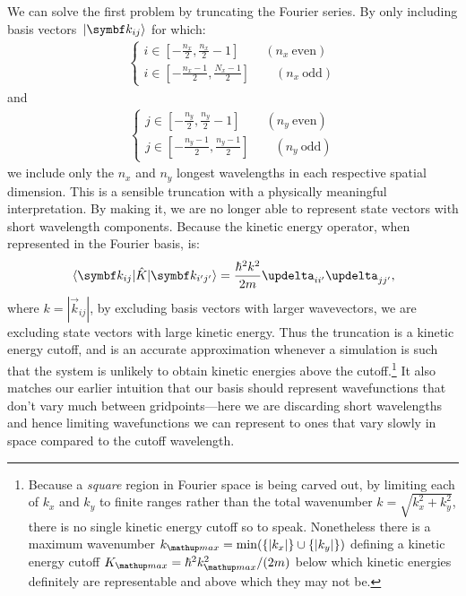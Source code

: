 We can solve the first problem by truncating the Fourier series. By only including basis vectors $\ket{\vec k_{ij}}$ for which:
\begin{align}
\begin{cases}
i \in [-\tfrac{n_x}2, \tfrac{n_x}2 - 1] \qquad (n_x\ \textrm{even})\\
i \in [-\tfrac{n_x - 1}2, \tfrac{N_x - 1}2] \qquad (n_x\ \textrm{odd})
\end{cases}
\end{align}
and
\begin{align}
\begin{cases}
j \in [-\tfrac{n_y}2, \tfrac{n_y}2 - 1] \qquad (n_y\ \textrm{even})\\
j \in [-\tfrac{n_y - 1}2, \tfrac{n_y - 1}2] \qquad (n_y\ \textrm{odd})
\end{cases}
\end{align}
we include only the $n_x$ and $n_y$ longest wavelengths in each respective spatial dimension. This is a sensible truncation with a physically meaningful interpretation. By making it, we are no longer able to represent state vectors with short wavelength components. Because the kinetic energy operator, when represented in the Fourier basis, is:
\begin{align}
\matrixel{\vec k_{ij}}{\hat K}{\vec k_{i^\prime j^\prime}} = \frac{\hbar^2 k^2}{2m}\updelta_{ii^\prime}\updelta_{jj^\prime},
\end{align}
where $k = |\vec k_{ij}|$, by excluding basis vectors with larger wavevectors, we are excluding state vectors with large kinetic energy. Thus the truncation is a kinetic energy cutoff, and is an accurate approximation whenever a simulation is such that the system is unlikely to obtain kinetic energies above the cutoff.\footnote{Because a \emph{square} region in Fourier space is being carved out, by limiting each of $k_x$ and $k_y$ to finite ranges rather than the total wavenumber $k = \sqrt{k_x^2 + k_y^2}$, there is no single kinetic energy cutoff so to speak. Nonetheless there is a maximum wavenumber $k_\up{max} = \min(\{|k_x|\} \cup \{|k_y|\})$ defining a kinetic energy cutoff $K_\up{max} = \hbar^2k_\up{max}^2/(2m)$ below which kinetic energies definitely are representable and above which they may not be.} It also matches our earlier intuition that our basis should represent wavefunctions that don't vary much between gridpoints---here we are discarding short wavelengths and hence limiting wavefunctions we can represent to ones that vary slowly in space compared to the cutoff wavelength.

